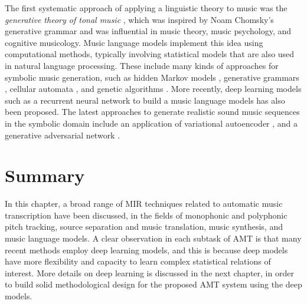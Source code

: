 The first systematic approach of applying a linguistic theory to music was the \emph{generative theory of tonal music} \cite{lerdahl1983gttm}, which was inspired by Noam Chomsky's generative grammar \cite{chomsky1966generative} and was influential in music theory, music psychology, and cognitive musicology.
Music language models implement this idea using computational methods, typically involving statistical models that are also used in natural language processing.
These include many kinds of approaches for symbolic music generation, such as hidden Markov models \cite{farbood2001markov}, generative grammars \cite{chemilier2001grammar}, cellular automata \cite{burraston2004automata}, and genetic algorithms \cite{miranda2007evolutionary}.
More recently, deep learning models such as a recurrent neural network to build a music language models \cite{sigtia2014lm} has also been proposed.
The latest approaches to generate realistic sound music sequences in the symbolic domain include an application of variational autoencoder \cite{teng2017generating,tikhonov2017generation}, and a generative adversarial network \cite{yang2017midinet}.

\section{Summary}

In this chapter, a broad range of MIR techniques related to automatic music transcription have been discussed, in the fields of monophonic and polyphonic pitch tracking, source separation and music translation, music synthesis, and music language models.
A clear observation in each subtask of AMT is that many recent methods employ deep learning models, and this is because deep models have more flexibility and capacity to learn complex statistical relations of interest.
More details on deep learning is discussed in the next chapter, in order to build solid methodological design for the proposed AMT system using the deep models.
